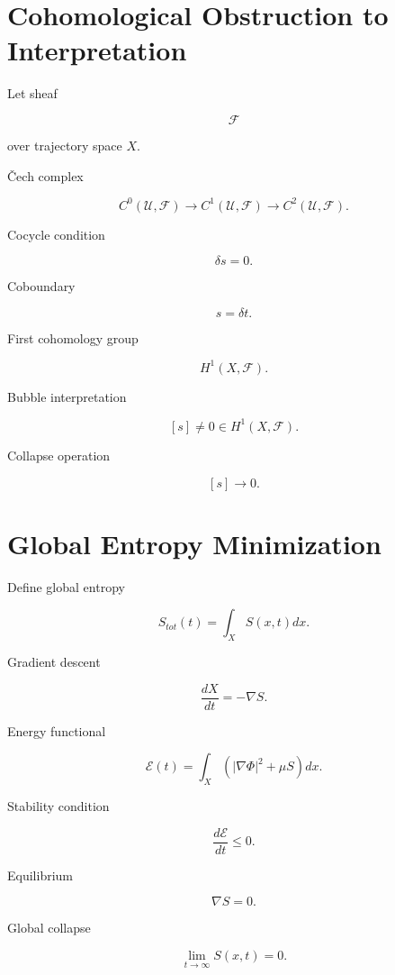 \documentclass[11pt]{article}
\begin{document}
\section{Cohomological Obstruction to Interpretation}

Let sheaf

\[
\mathcal{F}
\]

over trajectory space $X$.

Čech complex

\[
C^0(\mathcal{U},\mathcal{F})
\rightarrow
C^1(\mathcal{U},\mathcal{F})
\rightarrow
C^2(\mathcal{U},\mathcal{F}).
\]

Cocycle condition

\[
\delta s = 0.
\]

Coboundary

\[
s = \delta t.
\]

First cohomology group

\[
H^1(X,\mathcal{F}).
\]

Bubble interpretation

\[
[s] \neq 0
\in
H^1(X,\mathcal{F}).
\]

Collapse operation

\[
[s] \rightarrow 0.
\]


\section{Global Entropy Minimization}

Define global entropy

\[
S_{tot}(t)
=
\int_X S(x,t)dx.
\]

Gradient descent

\[
\frac{dX}{dt}
=
-\nabla S.
\]

Energy functional

\[
\mathcal{E}(t)
=
\int_X
\left(
|\nabla\Phi|^2
+
\mu S
\right) dx.
\]

Stability condition

\[
\frac{d\mathcal{E}}{dt} \le 0.
\]

Equilibrium

\[
\nabla S = 0.
\]

Global collapse

\[
\lim_{t\to\infty}
S(x,t) = 0.
\]

\end{document}
